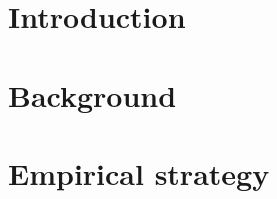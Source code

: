 























%








\maketitle

\thispagestyle{empty}

\clearpage

\pagestyle{scrheadings}

\small {
}
\clearpage
\normalsize

\section{Introduction}


\section{Background}


\section{Empirical strategy}


